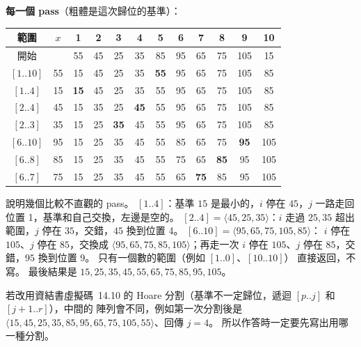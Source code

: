 \begin{pastsoln}
\textbf{每一個 pass}（粗體是這次歸位的基準）：
\begin{center}
\small
\begin{tabular}{cc*{10}{c}}
\toprule
範圍 & $x$ & 1 & 2 & 3 & 4 & 5 & 6 & 7 & 8 & 9 & 10 \\
\midrule
開始 & & 55 & 45 & 25 & 35 & 85 & 95 & 65 & 75 & 105 & 15 \\
$[1..10]$ & 55 & 15 & 45 & 25 & 35 & \textbf{55} & 95 & 65 & 75 & 105 & 85 \\
$[1..4]$ & 15 & \textbf{15} & 45 & 25 & 35 & 55 & 95 & 65 & 75 & 105 & 85 \\
$[2..4]$ & 45 & 15 & 35 & 25 & \textbf{45} & 55 & 95 & 65 & 75 & 105 & 85 \\
$[2..3]$ & 35 & 15 & 25 & \textbf{35} & 45 & 55 & 95 & 65 & 75 & 105 & 85 \\
$[6..10]$ & 95 & 15 & 25 & 35 & 45 & 55 & 85 & 65 & 75 & \textbf{95} & 105 \\
$[6..8]$ & 85 & 15 & 25 & 35 & 45 & 55 & 75 & 65 & \textbf{85} & 95 & 105 \\
$[6..7]$ & 75 & 15 & 25 & 35 & 45 & 55 & 65 & \textbf{75} & 85 & 95 & 105 \\
\bottomrule
\end{tabular}
\end{center}
說明幾個比較不直觀的 pass。 $[1..4]$：基準 $15$ 是最小的，$i$ 停在 $45$，$j$ 一路走回
位置 1，基準和自己交換，左邊是空的。 $[2..4] = \langle 45, 25, 35 \rangle$：$i$ 走過 $25, 35$
超出範圍，$j$ 停在 $35$，交錯，$45$ 換到位置 4。 $[6..10] = \langle 95, 65, 75, 105, 85 \rangle$：
$i$ 停在 $105$、$j$ 停在 $85$，交換成 $\langle 95, 65, 75, 85, 105 \rangle$；再走一次 $i$ 停在
$105$、$j$ 停在 $85$，交錯，$95$ 換到位置 9。 只有一個數的範圍（例如 $[1..0]$、$[10..10]$）
直接返回，不寫。 最後結果是 $15, 25, 35, 45, 55, 65, 75, 85, 95, 105$。

若改用資結書虛擬碼~14.10 的 Hoare 分割（基準不一定歸位，遞迴 $[p..j]$ 和 $[j+1..r]$），中間的
陣列會不同，例如第一次分割後是 $\langle 15, 45, 25, 35, 85, 95, 65, 75, 105, 55 \rangle$、回傳
$j = 4$。 所以作答時一定要先寫出用哪一種分割。
\end{pastsoln}
